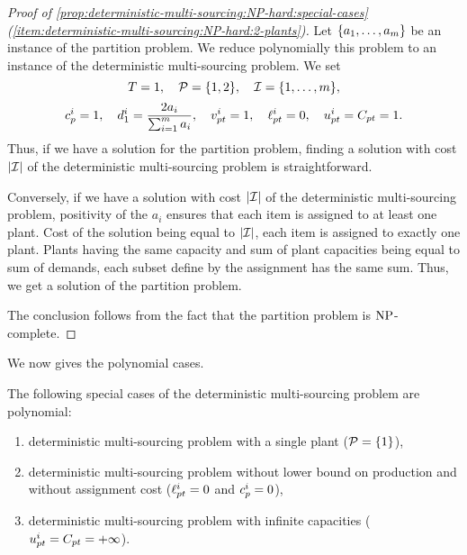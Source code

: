 \begin{proof}[Proof of \cref{prop:deterministic-multi-sourcing:NP-hard:special-cases} (\cref{item:deterministic-multi-sourcing:NP-hard:2-plants})]
Let $\crbracket{a_1,\ldots,a_m}$ be an instance of the partition problem.
We reduce polynomially this problem to an instance of the deterministic multi-sourcing problem.
We set
$$
  \horizon=1
  ,\quad
  \plants=\crbracket{1,2}
  ,\quad
  \REF=\range[1]{m},
$$
$$
  c_p^i=1
  ,\quad
  d_1^i=\frac{2a_i}{\sum_{i=1}^{m}a_i}
  ,\quad
  v_{pt}^i=1
  ,\quad
  \ell_{pt}^i=0
  ,\quad
  u_{pt}^i=C_{pt}=1.
$$
Thus, if we have a solution for the partition problem, finding a solution with cost $\card{\REF}$ of the deterministic multi-sourcing problem is straightforward.

Conversely, if we have a solution with cost $\card{\REF}$ of the deterministic multi-sourcing problem, positivity of the $a_i$ ensures that each item is assigned to at least one plant.
Cost of the solution being equal to $\card{\REF}$, each item is assigned to exactly one plant.
Plants having the same capacity and sum of plant capacities being equal to sum of demands, each subset define by the assignment has the same sum.
Thus, we get a solution of the partition problem.

The conclusion follows from the fact that the partition problem is $\operatorname{NP}$-complete.
\end{proof}


We now gives the polynomial cases.

\begin{prop}\label{prop:deterministic-multi-sourcing:polynomial-cases}
The following special cases of the deterministic multi-sourcing problem are polynomial:
\begin{enumerate}
  \item deterministic multi-sourcing problem with a single plant ($\plants=\crbracket{1}$),
  \item deterministic multi-sourcing problem without lower bound on production and without assignment cost ($\ell_{pt}^i=0$ and $c_p^i=0$),
  \item deterministic multi-sourcing problem with infinite capacities ($u_{pt}^i=C_{pt}=+\infty$).
\end{enumerate}
\end{prop}


